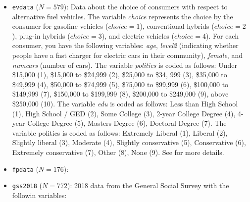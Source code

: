\documentclass[
]{article}
\begin{document}
\begin{itemize}
\item
  \texttt{evdata} (\(N=579\)): Data about the choice of consumers with respect to alternative fuel vehicles. The
  variable \emph{choice} represents the choice by the consumer for gasoline vehicles (\(choice = 1\)), conventional
  hybrids (\(choice = 2\)), plug-in hybrids (\(choice = 3\)), and electric vehicles (\(choice = 4\)). For each consumer,
  you have the following variables: \emph{age}, \emph{level2} (indicating whether people have a fast charger for electric cars in their community), \emph{female}, and \emph{numcars} (number of cars). The variable \emph{politics} is coded as follows: Under \$15,000 (1), \$15,000 to \$24,999 (2), \$25,000 to \$34, 999 (3), \$35,000 to \$49,999 (4), \$50,000 to \$74,999 (5), \$75,000 to \$99,999 (6), \$100,000 to \$149,999 (7), \$150,000 to \$199,999 (8), \$200,000 to \$249,000 (9), above \$250,000 (10). The variable \emph{edu} is coded as follows: Less than High School (1), High School / GED (2), Some College (3), 2-year College Degree (4), 4-year College Degree (5), Masters Degree (6), Doctoral Degree (7). The variable politics is coded as follows: Extremely Liberal (1), Liberal (2), Slightly liberal (3), Moderate (4), Slightly conservative (5), Conservative (6), Extremely conservative (7), Other (8), None (9). See \citet{Dumortier:2014} for more details.
\item
  \texttt{fpdata} (\(N=176\)):
\item
  \texttt{gss2018} (\(N=772\)): 2018 data from the General Social Survey with the followin variables:


\end{itemize}
\end{document}
